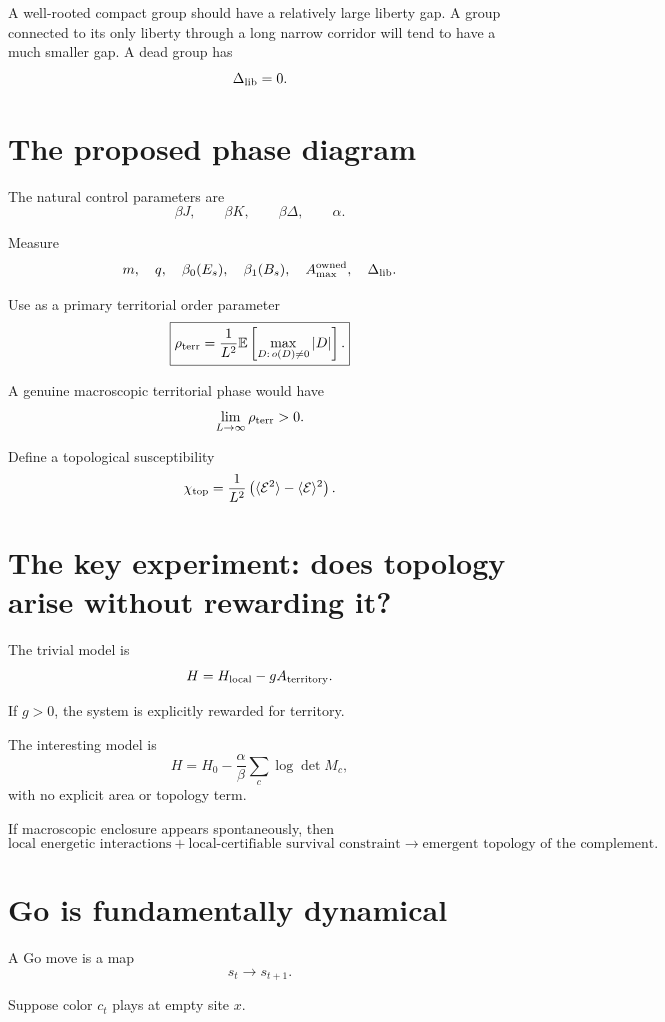 \documentclass[11pt]{article}
\begin{document}
A well-rooted compact group should have a relatively large liberty gap. A group connected to its only liberty through a long narrow corridor will tend to have a much smaller gap. A dead group has
\[
\Delta_{\rm lib}=0.
\]

\section{The proposed phase diagram}

The natural control parameters are
\[
\beta J,\qquad
\beta K,\qquad
\beta\Delta,\qquad
\alpha.
\]

Measure
\[
m,\quad
q,\quad
\beta_0(E_s),\quad
\beta_1(B_s),\quad
A_{\max}^{\rm owned},\quad
\Delta_{\rm lib}.
\]

Use as a primary territorial order parameter
\[
\boxed{
\rho_{\rm terr}
=
\frac{1}{L^2}
\mathbb E
\left[
\max_{D:\,o(D)\neq0}|D|
\right].
}
\]

A genuine macroscopic territorial phase would have
\[
\lim_{L\rightarrow\infty}\rho_{\rm terr}>0.
\]

Define a topological susceptibility
\[
\chi_{\rm top}
=
\frac{1}{L^2}
\left(
\langle\mathcal E^2\rangle
-
\langle\mathcal E\rangle^2
\right).
\]

\section{The key experiment: does topology arise without rewarding it?}

The trivial model is
\[
H=H_{\rm local}-gA_{\rm territory}.
\]

If \(g>0\), the system is explicitly rewarded for territory.

The interesting model is
\[
\boxed{
H
=
H_0
-
\frac{\alpha}{\beta}
\sum_c\log\det M_c,
}
\]
with no explicit area or topology term.

If macroscopic enclosure appears spontaneously, then
\[
\boxed{
\text{local energetic interactions}
+
\text{local-certifiable survival constraint}
\rightarrow
\text{emergent topology of the complement}.
}
\]

\section{Go is fundamentally dynamical}

A Go move is a map
\[
s_t\rightarrow s_{t+1}.
\]

Suppose color \(c_t\) plays at empty site \(x\).
\end{document}
